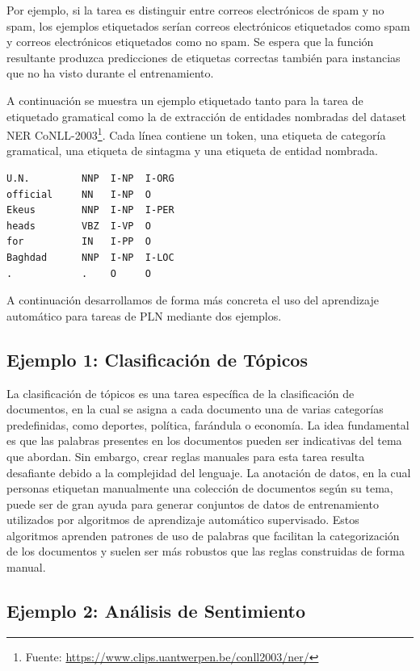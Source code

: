 Por ejemplo, si la tarea es distinguir entre correos electrónicos de spam y no spam, los ejemplos etiquetados serían correos electrónicos etiquetados como spam y correos electrónicos etiquetados como no spam. Se espera que la función resultante produzca predicciones de etiquetas correctas también para instancias que no ha visto durante el entrenamiento.

A continuación se muestra un ejemplo etiquetado tanto para la tarea de etiquetado gramatical como la de extracción de entidades nombradas del dataset NER CoNLL-2003\footnote{Fuente: \url{https://www.clips.uantwerpen.be/conll2003/ner/}}. Cada línea contiene un token, una etiqueta de categoría gramatical, una etiqueta de sintagma y una etiqueta de entidad nombrada.

\begin{center}
\begin{verbatim}
U.N.         NNP  I-NP  I-ORG
official     NN   I-NP  O
Ekeus        NNP  I-NP  I-PER
heads        VBZ  I-VP  O
for          IN   I-PP  O
Baghdad      NNP  I-NP  I-LOC
.            .    O     O
\end{verbatim}
\end{center}


A continuación desarrollamos de forma más concreta el uso del aprendizaje automático para tareas de PLN mediante dos ejemplos.

\subsection{Ejemplo 1: Clasificación de Tópicos}

La clasificación de tópicos es una tarea específica de la clasificación de documentos, en la cual se asigna a cada documento una de varias categorías predefinidas, como deportes, política, farándula o economía. La idea fundamental es que las palabras presentes en los documentos pueden ser indicativas del tema que abordan. Sin embargo, crear reglas manuales para esta tarea resulta desafiante debido a la complejidad del lenguaje. La anotación de datos, en la cual personas etiquetan manualmente una colección de documentos según su tema, puede ser de gran ayuda para generar conjuntos de datos de entrenamiento utilizados por algoritmos de aprendizaje automático supervisado. Estos algoritmos aprenden patrones de uso de palabras que facilitan la categorización de los documentos y suelen ser más robustos que las reglas construidas de forma manual.


\subsection{Ejemplo 2: Análisis de Sentimiento}


